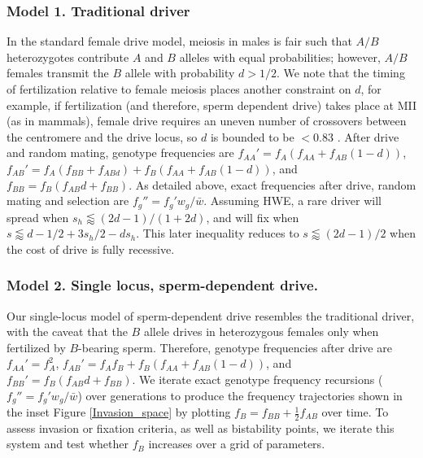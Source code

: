 \documentclass[12pt,letterpaper]{article}
\newcommand{\gc}[1]{{ \color{red} #1}}
\begin{document}
\subsubsection*{Model 1. Traditional driver}
In the standard female drive model, meiosis in males is fair such that $A/B$ heterozygotes contribute $A$ and $B$ alleles with equal probabilities; however, $A/B$ females transmit the $B$ allele with probability $d>1/2$.  
We note that the timing of fertilization relative to female meiosis places another constraint on $d$, for example, if fertilization (and therefore, sperm dependent drive) takes place at MII (as in mammals),
	female drive requires an uneven number of crossovers between the centromere and the drive locus, 
	so $d$ is bounded to be $<0.83$ \citep[see ][ for discussion]{Buckler1999}. 
After drive and random mating, genotype frequencies are 
	$f_{AA}'=f_A (f_{AA }+ f_{AB} (1 - d))$, 
	$f_{AB}'=f_A (f_{BB} + f_{ABd}) + f_B (f_{AA} + f_{AB} (1 - d))$,
	and $f_{BB}= f_B (f_{AB} d + f_{BB})$. 
As detailed above, exact frequencies after drive, random mating and selection are $f_g''= f_g'w_g/\bar{w}$. 
Assuming HWE, a rare driver will spread when $s_h
        \lessapprox(2d-1)/(1+2d)$, and will fix when $s\lessapprox d -1/2 +
        3 s_h /2- d s_h$. This later inequality reduces to
        $s\lessapprox(2d-1)/2$ when the cost of drive is fully
        recessive. 
	
\subsubsection*{Model 2. Single locus, sperm-dependent drive.}
Our single-locus model of sperm-dependent drive resembles the traditional driver, with the caveat that the $B$ allele drives in heterozygous females only when fertilized by $B$-bearing sperm. 
Therefore, genotype frequencies after drive are 
	$f_{AA}'=f_A^2$, 
	$f_{AB}'=f_A f_B+f_B (f_{AA} + f_{AB}(1 - d)) $,
	and $f_{BB}'= f_B (f_{AB} d + f_{BB} )$. 
We iterate exact genotype frequency recursions ($f_g''= f_g'w_g/\bar{w}$) over generations to produce the frequency trajectories shown in the inset
Figure \ref{Invasion_space} by plotting $f_B=f_{BB}+ \frac{1}{2}f_{AB}$
over time. %
To assess invasion or fixation criteria, as well as bistability points, we iterate this system and
test whether $f_B$ increases over a grid of parameters. 
\end{document}
